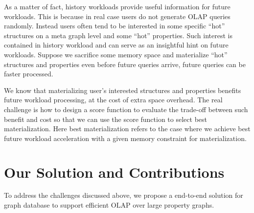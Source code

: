 As a matter of fact, history workloads provide useful information for future workloads. This is because in real case users do not generate OLAP queries randomly. Instead users often tend to be interested in some specific ``hot'' structures on a meta graph level and some ``hot'' properties. Such interest is contained in history workload and can serve as an insightful hint on future workloads. Suppose we sacrifice some memory space and materialize ``hot'' structures and properties even before future queries arrive, future queries can be faster processed.  


We know that materializing user's interested structures and properties benefits future workload processing, at the cost of extra space overhead. The real challenge is how to design a score function to evaluate the trade-off  between such benefit and cost so that we can use the score function to select best materialization. Here best materialization refers to the case where we achieve best future workload acceleration with a given memory constraint for materialization.

	
	


\section{Our Solution and Contributions}
To address the challenges discussed above, we propose a end-to-end solution for graph database to  support efficient  OLAP over large property graphs.

